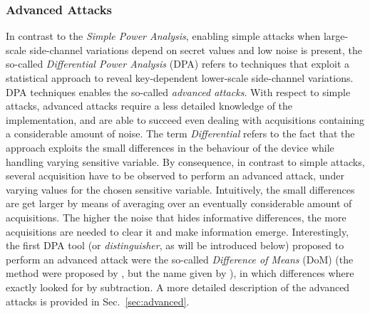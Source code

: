 \subsubsection{Advanced Attacks} 
In contrast to the \emph{Simple Power Analysis}, enabling simple attacks when large-scale side-channel variations depend on secret values and low noise is present, the so-called \emph{Differential Power Analysis} (DPA) refers to techniques that exploit  a statistical approach to reveal key-dependent lower-scale side-channel variations. DPA techniques enables the so-called \emph{advanced attacks}. With respect to simple attacks, advanced attacks  require a less detailed knowledge of the implementation, and are able to succeed even dealing with acquisitions containing a considerable amount of noise. The term \emph{Differential} refers to the fact that the approach exploits the small differences in the behaviour of the device while handling varying sensitive variable. By consequence, in contrast to simple attacks,  several acquisition have to be observed to perform an advanced attack, under varying values for the chosen sensitive variable. Intuitively, the small differences are get larger by means of averaging over an eventually considerable amount of acquisitions. The higher the noise that hides informative differences, the more acquisitions are needed to clear it and make information emerge. Interestingly, the first DPA tool (or \emph{distinguisher}, as will be introduced below) proposed to perform an advanced attack were the so-called \emph{Difference of Means} (DoM) (the method were proposed by \cite{kocher1999differential}, but the name given by \cite{Chari2003}),  in which differences where exactly looked for by subtraction. A more detailed description of the advanced attacks is provided in Sec.~\ref{sec:advanced}.\\



